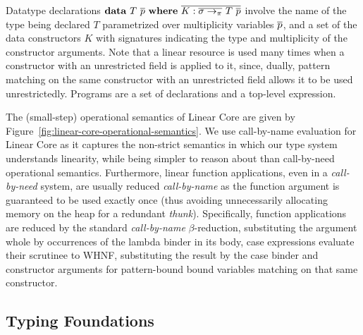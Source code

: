 \documentclass[acmsmall, screen, review]{acmart}
\begin{document}
Datatype declarations $\mathbf{data}~T~\overline{p}~\mathbf{where}~\overline{K:\overline{\sigma
\to_\pi}~T~\overline{p} }$ involve the name of the type being declared $T$
parametrized over multiplicity variables $\overline{p}$, and a set of the data
constructors $K$ with signatures indicating the type and multiplicity of the
constructor arguments. Note that a linear resource is used many times when a
constructor with an unrestricted field is applied to it, since, dually, pattern
matching on the same constructor with an unrestricted field allows it to be
used unrestrictedly. Programs are a set of declarations and a top-level
expression.

\SyntaxFull


The (small-step) operational semantics of Linear Core are given by
Figure~\ref{fig:linear-core-operational-semantics}. We use call-by-name
evaluation for Linear Core as it captures the non-strict semantics in which
our type system understands linearity, while being simpler to reason about than
call-by-need operational semantics.
Furthermore, linear function applications, even in a \emph{call-by-need} system, are
usually reduced \emph{call-by-name} as the function argument is guaranteed to
be used exactly once (thus avoiding unnecessarily allocating memory on the heap
for a redundant \emph{thunk}).
%
Specifically, function applications are reduced by the standard
\emph{call-by-name} $\beta$-reduction, substituting the argument whole by
occurrences of the lambda binder in its body, case expressions evaluate their
scrutinee to WHNF, substituting the result by the case binder and constructor
arguments for pattern-bound bound variables matching on that same constructor.



\subsection{Typing Foundations\label{sec:base-calculi}}
\end{document}
